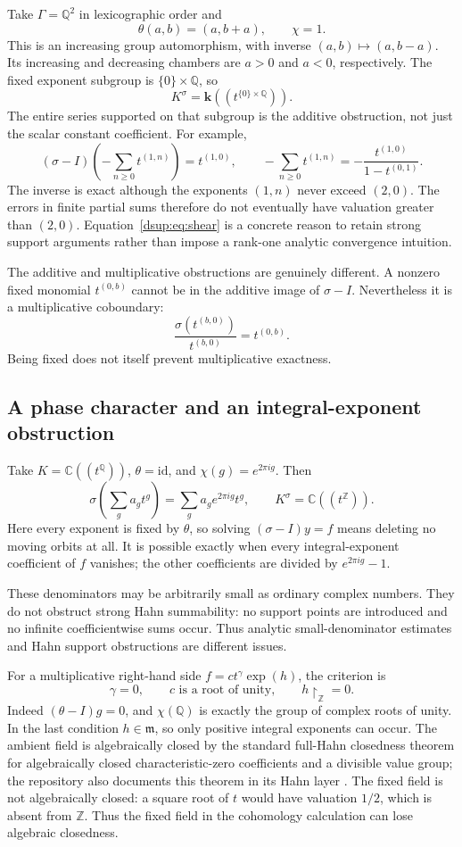 \documentclass[11pt,oneside]{article}
\numberwithin{equation}{section}
\theoremstyle{definition}
\theoremstyle{remark}
\newcommand{\C}{\mathbb C}
\newcommand{\Q}{\mathbb Q}
\newcommand{\Z}{\mathbb Z}
\newcommand{\kk}{\mathbf k}
\newcommand{\mm}{\mathfrak m}
\newcommand{\id}{\mathrm{id}}
\newcommand{\restr}[2]{#1\!\upharpoonright_{#2}}
\begin{document}
Take $\Gamma=\Q^2$ in lexicographic order and
\[
 \theta(a,b)=(a,b+a),\qquad\chi=1.
\]
This is an increasing group automorphism, with inverse
$(a,b)\mapsto(a,b-a)$. Its increasing and decreasing chambers are $a>0$
and $a<0$, respectively. The fixed exponent subgroup is
$\{0\}\times\Q$, so
\[
 K^\sigma=\kk((t^{\{0\}\times\Q})).
\]
The entire series supported on that subgroup is the additive obstruction,
not just the scalar constant coefficient. For example,
\begin{equation}\label{dsup:eq:shear}
 (\sigma-I)\left(-\sum_{n\ge0}t^{(1,n)}\right)=t^{(1,0)},
 \qquad
 -\sum_{n\ge0}t^{(1,n)}
   =-\frac{t^{(1,0)}}{1-t^{(0,1)}}.
\end{equation}
The inverse is exact although the exponents $(1,n)$ never exceed $(2,0)$.
The errors in finite partial sums therefore do not eventually have
valuation greater than $(2,0)$. Equation~\eqref{dsup:eq:shear} is a concrete
reason to retain strong support arguments rather than impose a rank-one
analytic convergence intuition.

The additive and multiplicative obstructions are genuinely different.
A nonzero fixed monomial $t^{(0,b)}$ cannot be in the additive image of
$\sigma-I$. Nevertheless it is a multiplicative coboundary:
\[
 \frac{\sigma(t^{(b,0)})}{t^{(b,0)}}=t^{(0,b)}.
\]
Being fixed does not itself prevent multiplicative exactness.

\subsection{A phase character and an integral-exponent obstruction}

Take $K=\C((t^\Q))$, $\theta=\id$, and
$\chi(g)=e^{2\pi i g}$. Then
\[
 \sigma\left(\sum_g a_gt^g\right)
       =\sum_g a_ge^{2\pi i g}t^g,
 \qquad K^\sigma=\C((t^\Z)).
\]
Here every exponent is fixed by $\theta$, so solving
$(\sigma-I)y=f$ means deleting no moving orbits at all. It is possible
exactly when every integral-exponent coefficient of $f$ vanishes; the
other coefficients are divided by $e^{2\pi i g}-1$.

These denominators may be arbitrarily small as ordinary complex numbers.
They do not obstruct strong Hahn summability: no support points are
introduced and no infinite coefficientwise sums occur. Thus analytic
small-denominator estimates and Hahn support obstructions are different
issues.

For a multiplicative right-hand side $f=ct^\gamma\exp(h)$, the criterion
is
\[
 \gamma=0,\qquad c\text{ is a root of unity},\qquad
 \restr h{\Z}=0.
\]
Indeed $(\theta-I)g=0$, and $\chi(\Q)$ is exactly the group of complex
roots of unity. In the last condition $h\in\mm$, so only positive
integral exponents can occur. The ambient field is algebraically closed by the standard full-Hahn
closedness theorem for algebraically closed characteristic-zero coefficients
and a divisible value group; the repository also documents this theorem
in its Hahn layer \cite{Repo}. The fixed field is not algebraically
closed: a square root of $t$ would have valuation $1/2$, which is absent
from $\Z$. Thus the fixed field in the cohomology calculation can lose
algebraic closedness.
\end{document}
